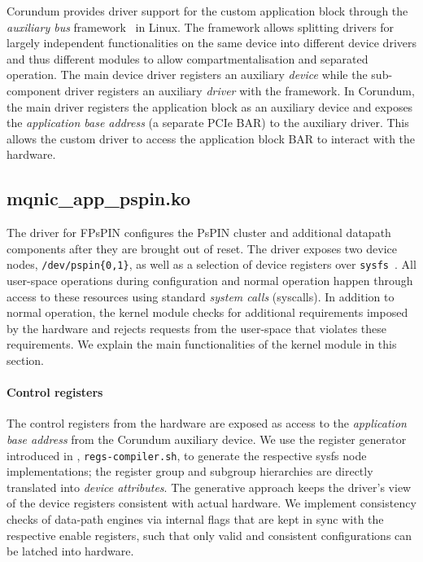 Corundum provides driver support for the custom application block through the \emph{auxiliary bus} framework~\cite{noauthor_auxiliary_nodate} in Linux.  The framework allows splitting drivers for largely independent functionalities on the same device into different device drivers and thus different modules to allow compartmentalisation and separated operation.  The main device driver registers an auxiliary \emph{device} while the sub-component driver registers an auxiliary \emph{driver} with the framework.  In Corundum, the main driver registers the application block as an auxiliary device and exposes the \emph{application base address} (a separate PCIe BAR) to the auxiliary driver.  This allows the custom driver to access the application block BAR to interact with the hardware.

\subsection{mqnic\_\-app\_\-pspin.ko} \label{sec:app-kmod}

The driver for FPsPIN configures the PsPIN cluster and additional datapath components after they are brought out of reset.  The driver exposes two device nodes, \texttt{/dev/pspin\{0,1\}}, as well as a selection of device registers over \texttt{sysfs}~\cite{mochel_sysfs_2011}.  All user-space operations during configuration and normal operation happen through access to these resources using standard \emph{system calls} (syscalls).  In addition to normal operation, the kernel module checks for additional requirements imposed by the hardware and rejects requests from the user-space that violates these requirements.  We explain the main functionalities of the kernel module in this section.

\paragraph{Control registers} The control registers from the hardware are exposed as access to the \emph{application base address} from the Corundum auxiliary device.  We use the register generator introduced in , \texttt{regs-compiler.sh}, to generate the respective sysfs node implementations; the register group and subgroup hierarchies are directly translated into \emph{device attributes}.  The generative approach keeps the driver's view of the device registers consistent with actual hardware.  We implement consistency checks of data-path engines via internal flags that are kept in sync with the respective enable registers, such that only valid and consistent configurations can be latched into hardware.

